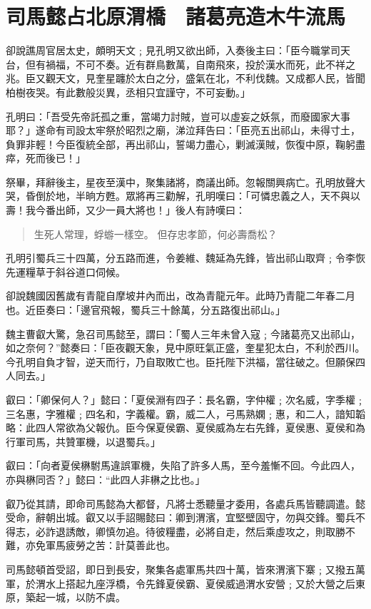 
\chapter{司馬懿占北原渭橋　諸葛亮造木牛流馬}

卻說譙周官居太史，頗明天文﹔見孔明又欲出師，入奏後主曰：「臣今職掌司天台，但有禍福，不可不奏。近有群鳥數萬，自南飛來，投於漢水而死，此不祥之兆。臣又觀天文，見奎星躔於太白之分，盛氣在北，不利伐魏。又成都人民，皆聞柏樹夜哭。有此數般災異，丞相只宜謹守，不可妄動。」

孔明曰：「吾受先帝託孤之重，當竭力討賊，豈可以虛妄之妖氛，而廢國家大事耶？」遂命有司設太牢祭於昭烈之廟，涕泣拜告曰：「臣亮五出祁山，未得寸土，負罪非輕！今臣復統全部，再出祁山，誓竭力盡心，剿滅漢賊，恢復中原，鞠躬盡瘁，死而後已！」

祭畢，拜辭後主，星夜至漢中，聚集諸將，商議出師。忽報關興病亡。孔明放聲大哭，昏倒於地，半晌方甦。眾將再三勸解，孔明嘆曰：「可憐忠義之人，天不與以壽！我今番出師，又少一員大將也！」後人有詩嘆曰：

\begin{quote}
生死人常理，蜉蝣一樣空。
但存忠孝節，何必壽喬松？
\end{quote}

孔明引蜀兵三十四萬，分五路而進，令姜維、魏延為先鋒，皆出祁山取齊﹔令李恢先運糧草于斜谷道口伺候。

卻說魏國因舊歲有青龍自摩坡井內而出，改為青龍元年。此時乃青龍二年春二月也。近臣奏曰：「邊官飛報，蜀兵三十餘萬，分五路復出祁山。」

魏主曹叡大驚，急召司馬懿至，謂曰：「蜀人三年未曾入寇﹔今諸葛亮又出祁山，如之奈何？”懿奏曰：「臣夜觀天象，見中原旺氣正盛，奎星犯太白，不利於西川。今孔明自負才智，逆天而行，乃自取敗亡也。臣托陛下洪福，當往破之。但願保四人同去。」

叡曰：「卿保何人？」懿曰：「夏侯淵有四子：長名霸，字仲權﹔次名威，字季權﹔三名惠，字雅權﹔四名和，字義權。霸，威二人，弓馬熟嫻﹔惠，和二人，諳知韜略：此四人常欲為父報仇。臣今保夏侯霸、夏侯威為左右先鋒，夏侯惠、夏侯和為行軍司馬，共贊軍機，以退蜀兵。」

叡曰：「向者夏侯楙駙馬違誤軍機，失陷了許多人馬，至今羞慚不回。今此四人，亦與楙同否？」懿曰：“此四人非楙之比也。」

叡乃從其請，即命司馬懿為大都督，凡將士悉聽量才委用，各處兵馬皆聽調遣。懿受命，辭朝出城。叡又以手詔賜懿曰：卿到渭濱，宜堅壁固守，勿與交鋒。蜀兵不得志，必詐退誘敵，卿慎勿追。待彼糧盡，必將自走，然后乘虛攻之，則取勝不難，亦免軍馬疲勞之苦：計莫善此也。

司馬懿頓首受詔，即日到長安，聚集各處軍馬共四十萬，皆來渭濱下寨﹔又撥五萬軍，於渭水上搭起九座浮橋，令先鋒夏侯霸、夏侯威過渭水安營﹔又於大營之后東原，築起一城，以防不虞。

